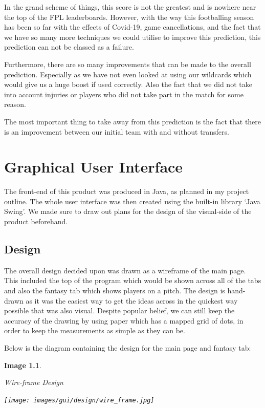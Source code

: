 \documentclass[12pt, a4paper, oneside]{book}
\newtheorem{image}[theorem]{Image}
\numberwithin{equation}{section}
\begin{document}
In the grand scheme of things, this score is not the greatest and is nowhere near the top of the FPL leaderboards. However, with the way this footballing season has been so far with the effects of Covid-19, game cancellations, and the fact that we have so many more techniques we could utilise to improve this prediction, this prediction can not be classed as a failure.

Furthermore, there are so many improvements that can be made to the overall prediction. Especially as we have not even looked at using our wildcards which would give us a huge boost if used correctly. Also the fact that we did not take into account injuries or players who did not take part in the match for some reason.

The most important thing to take away from this prediction is the fact that there is an improvement between our initial team with and without transfers.


\chapter{Graphical User Interface}\label{ch:6}

The front-end of this product was produced in Java, as planned in my project outline. The whole user interface was then created using the built-in library `Java Swing'. We made sure to draw out plans for the design of the visual-side of the product beforehand.

\section{Design}\label{sec:6.1}

The overall design decided upon was drawn as a wireframe of the main page. This included the top of the program which would be shown across all of the tabs and also the fantasy tab which shows players on a pitch. The design is hand-drawn as it was the easiest way to get the ideas across in the quickest way possible that was also visual. Despite popular belief, we can still keep the accuracy of the drawing by using paper which has a mapped grid of dots, in order to keep the measurements as simple as they can be.

Below is the diagram containing the design for the main page and fantasy tab:

\begin{image} \label{Main page wire-frame}

  Wire-frame Design

  \vspace{0.5cm}

  \centerline{\texttt{[image: images/gui/design/wire\_frame.jpg]}}

\end{image}
\end{document}
